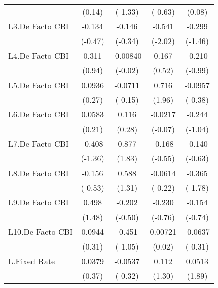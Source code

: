 {\begin{longtable}{l*{4}{c}}
                &   (0.14)         &  (-1.33)         &  (-0.63)         &   (0.08)         \\
[1em]
L3.De Facto CBI &   -0.134         &   -0.146         &   -0.541\sym{*}  &   -0.299         \\
                &  (-0.47)         &  (-0.34)         &  (-2.02)         &  (-1.46)         \\
[1em]
L4.De Facto CBI &    0.311         & -0.00840         &    0.167         &   -0.210         \\
                &   (0.94)         &  (-0.02)         &   (0.52)         &  (-0.99)         \\
[1em]
L5.De Facto CBI &   0.0936         &  -0.0711         &    0.716         &  -0.0957         \\
                &   (0.27)         &  (-0.15)         &   (1.96)         &  (-0.38)         \\
[1em]
L6.De Facto CBI &   0.0583         &    0.116         &  -0.0217         &   -0.244         \\
                &   (0.21)         &   (0.28)         &  (-0.07)         &  (-1.04)         \\
[1em]
L7.De Facto CBI &   -0.408         &    0.877         &   -0.168         &   -0.140         \\
                &  (-1.36)         &   (1.83)         &  (-0.55)         &  (-0.63)         \\
[1em]
L8.De Facto CBI &   -0.156         &    0.588         &  -0.0614         &   -0.365         \\
                &  (-0.53)         &   (1.31)         &  (-0.22)         &  (-1.78)         \\
[1em]
L9.De Facto CBI &    0.498         &   -0.202         &   -0.230         &   -0.154         \\
                &   (1.48)         &  (-0.50)         &  (-0.76)         &  (-0.74)         \\
[1em]
L10.De Facto CBI&   0.0944         &   -0.451         &  0.00721         &  -0.0637         \\
                &   (0.31)         &  (-1.05)         &   (0.02)         &  (-0.31)         \\
[1em]
L.Fixed Rate    &   0.0379         &  -0.0537         &    0.112         &   0.0513         \\
                &   (0.37)         &  (-0.32)         &   (1.30)         &   (1.89)         \\

\end{longtable}}
